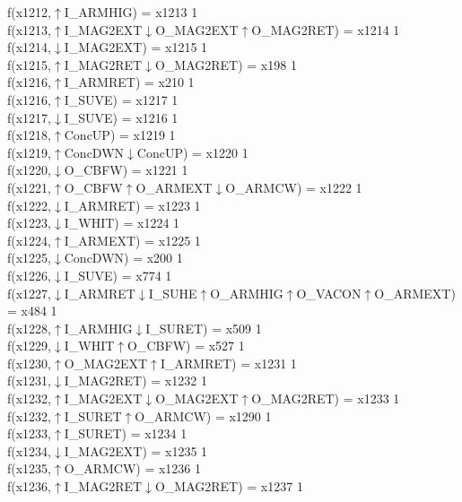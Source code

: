 f(x1212,$\uparrow$I\_ARMHIG) = x1213 {1} \\
f(x1213,$\uparrow$I\_MAG2EXT$\downarrow$O\_MAG2EXT$\uparrow$O\_MAG2RET) = x1214 {1} \\
f(x1214,$\downarrow$I\_MAG2EXT) = x1215 {1} \\
f(x1215,$\uparrow$I\_MAG2RET$\downarrow$O\_MAG2RET) = x198 {1} \\
f(x1216,$\uparrow$I\_ARMRET) = x210 {1} \\
f(x1216,$\uparrow$I\_SUVE) = x1217 {1} \\
f(x1217,$\downarrow$I\_SUVE) = x1216 {1} \\
f(x1218,$\uparrow$ConcUP) = x1219 {1} \\
f(x1219,$\uparrow$ConcDWN$\downarrow$ConcUP) = x1220 {1} \\
f(x1220,$\downarrow$O\_CBFW) = x1221 {1} \\
f(x1221,$\uparrow$O\_CBFW$\uparrow$O\_ARMEXT$\downarrow$O\_ARMCW) = x1222 {1} \\
f(x1222,$\downarrow$I\_ARMRET) = x1223 {1} \\
f(x1223,$\downarrow$I\_WHIT) = x1224 {1} \\
f(x1224,$\uparrow$I\_ARMEXT) = x1225 {1} \\
f(x1225,$\downarrow$ConcDWN) = x200 {1} \\
f(x1226,$\downarrow$I\_SUVE) = x774 {1} \\
f(x1227,$\downarrow$I\_ARMRET$\downarrow$I\_SUHE$\uparrow$O\_ARMHIG$\uparrow$O\_VACON$\uparrow$O\_ARMEXT) = x484 {1} \\
f(x1228,$\uparrow$I\_ARMHIG$\downarrow$I\_SURET) = x509 {1} \\
f(x1229,$\downarrow$I\_WHIT$\uparrow$O\_CBFW) = x527 {1} \\
f(x1230,$\uparrow$O\_MAG2EXT$\uparrow$I\_ARMRET) = x1231 {1} \\
f(x1231,$\downarrow$I\_MAG2RET) = x1232 {1} \\
f(x1232,$\uparrow$I\_MAG2EXT$\downarrow$O\_MAG2EXT$\uparrow$O\_MAG2RET) = x1233 {1} \\
f(x1232,$\uparrow$I\_SURET$\uparrow$O\_ARMCW) = x1290 {1} \\
f(x1233,$\uparrow$I\_SURET) = x1234 {1} \\
f(x1234,$\downarrow$I\_MAG2EXT) = x1235 {1} \\
f(x1235,$\uparrow$O\_ARMCW) = x1236 {1} \\
f(x1236,$\uparrow$I\_MAG2RET$\downarrow$O\_MAG2RET) = x1237 {1} \\
